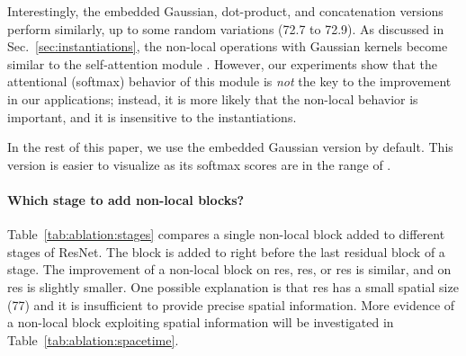 \documentclass[10pt,twocolumn,letterpaper]{article}
\def\x{}
\begin{document}
Interestingly, the embedded Gaussian, dot-product, and concatenation versions perform similarly, up to some random variations (72.7 to 72.9). As discussed in Sec.~\ref{sec:instantiations}, the non-local operations with Gaussian kernels become similar to the self-attention module \cite{Vaswani2017}. However, our experiments show that the attentional (softmax) behavior of this module is \emph{not} the key to the improvement in our applications; instead, it is more likely that the non-local behavior is important, and it is insensitive to the instantiations.

In the rest of this paper, we use the embedded Gaussian version by default. This version is easier to visualize as its softmax scores are in the range of .

\paragraph{Which stage to add non-local blocks?} Table~\ref{tab:ablation:stages} compares a single non-local block added to different stages of ResNet. The block is added to right before the last residual block of a stage. The improvement of a non-local block on res, res, or res is similar, and on res is slightly smaller. One possible explanation is that res has a small spatial size (7\x7) and it is insufficient to provide precise spatial information. More evidence of a non-local block exploiting spatial information will be investigated in Table~\ref{tab:ablation:spacetime}.
\end{document}
